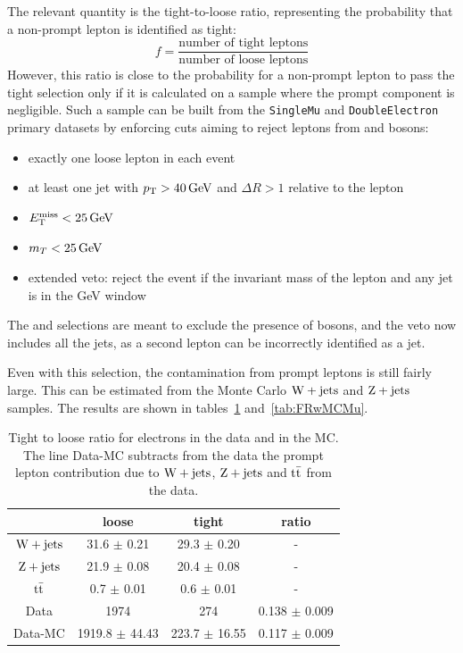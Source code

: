 The relevant quantity is the tight-to-loose ratio, representing the
probability that a non-prompt lepton is identified as tight:
\begin{equation*}
    f = \dfrac{\text{number of tight leptons}}{\text{number of loose
    leptons}}
\end{equation*}
However, this ratio is close to the probability for a non-prompt lepton to
pass the tight selection only if it is calculated on a sample where the
prompt component is negligible. Such a sample can be built from the
\texttt{SingleMu} and \texttt{DoubleElectron} primary datasets by enforcing
cuts aiming to reject leptons from \W and \Z bosons:
\begin{itemize}
    \item exactly one loose lepton in each event
    \item at least one jet with $\pt > \unit[40]{GeV}$ and $\Delta R > 1$
        relative to the lepton
    \item $\met < \unit[25]{GeV}$
    \item $\mt < \unit[25]{GeV}$
    \item extended \Z veto: reject the event if the invariant mass of the
        lepton and any jet is in the \unit[76-106]{GeV} window
\end{itemize}
The \met and \mt selections are meant to exclude the presence of \W bosons,
and the \Z veto now includes all the jets, as a second lepton can be incorrectly
identified as a jet.

Even with this selection, the contamination from prompt leptons is still
fairly large. This can be estimated from the Monte Carlo $\mathrm{W} + \text{jets}$ and
$\mathrm{Z} + \text{jets}$ samples. The results are shown in
tables~\ref{tab:FRwMCEl} and~\ref{tab:FRwMCMu}.
\begin{table}[htb]
\begin{center}
\begin{tabular}{*4c}
    \toprule
 & 	 loose & 	 tight & 	 ratio \\
 \midrule
 $\mathrm{W} + \text{jets}$ & 	31.6 $\pm$ 0.21 & 	29.3 $\pm$ 0.20 & 	     -     \\
$\mathrm{Z} + \text{jets}$ & 	21.9 $\pm$ 0.08 & 	20.4 $\pm$ 0.08 & 	     -     \\
$\mathrm{t}\bar{\mathrm{t}}$ & 	 0.7 $\pm$ 0.01 & 	 0.6 $\pm$ 0.01 & 	     -     \\
\midrule
Data & 	 1974 & 	  274 & 	0.138 $\pm$ 0.009 \\
Data-MC &	1919.8 $\pm$ 44.43 & 	223.7 $\pm$ 16.55 & 	0.117 $\pm$ 0.009 \\
\bottomrule
\end{tabular}
\caption{Tight to loose ratio for electrons in the data and in the MC. The line
    Data-MC subtracts from the data the prompt lepton contribution due to
    $\mathrm{W} + \text{jets}$, 
$\mathrm{Z} + \text{jets}$ and $\mathrm{t}\bar{\mathrm{t}}$ from the data.}
\label{tab:FRwMCEl}
\end{center}
\end{table}

